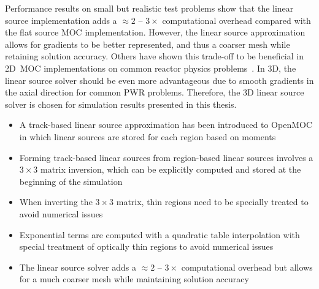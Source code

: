 Performance results on small but realistic test problems show that the linear source implementation adds a  $\approx 2$ -- $3\times$ computational overhead compared with the flat source \ac{MOC} implementation. However, the linear source approximation allows for gradients to be better represented, and thus a coarser mesh while retaining solution accuracy. Others have shown this trade-off to be beneficial in 2D~\ac{MOC} implementations on common reactor physics problems~\cite{ferrer2015linear}. In 3D, the linear source solver should be even more advantageous due to smooth gradients in the axial direction for common \ac{PWR} problems. Therefore, the 3D linear source solver is chosen for simulation results presented in this thesis.

\clearpage

\vfill
\begin{highlightsbox}[frametitle=Highlights]
\begin{itemize}
\item A track-based linear source approximation has been introduced to OpenMOC in which linear sources are stored for each region based on moments

\item Forming track-based linear sources from region-based linear sources involves a $3 \times 3$ matrix inversion, which can be explicitly computed and stored at the beginning of the simulation

\item When inverting the $3\times 3$ matrix, thin regions need to be specially treated to avoid numerical issues

\item Exponential terms are computed with a quadratic table interpolation with special treatment of optically thin regions to avoid numerical issues

\item The linear source solver adds a $\approx 2$ -- $3\times$ computational overhead but allows for a much coarser mesh while maintaining solution accuracy

\end{itemize}
\end{highlightsbox}
\vfill